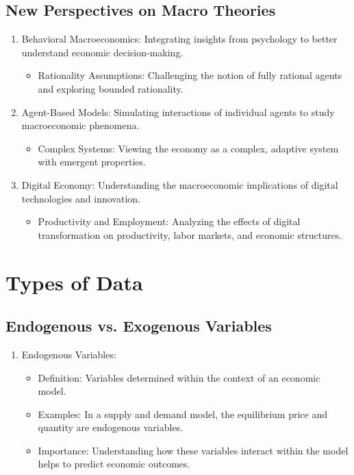 \documentclass[10pt]{article}
\begin{document}
\begin{enumerate}
\begin{enumerate}
\end{enumerate}

\subsection*{New Perspectives on Macro Theories}
\begin{enumerate}
  \item Behavioral Macroeconomics: Integrating insights from psychology to better understand economic decision-making.

    \begin{itemize}
      \item Rationality Assumptions: Challenging the notion of fully rational agents and exploring bounded rationality.
    \end{itemize}

  \item Agent-Based Models: Simulating interactions of individual agents to study macroeconomic phenomena.

    \begin{itemize}
      \item Complex Systems: Viewing the economy as a complex, adaptive system with emergent properties.
    \end{itemize}

  \item Digital Economy: Understanding the macroeconomic implications of digital technologies and innovation.

    \begin{itemize}
      \item Productivity and Employment: Analyzing the effects of digital transformation on productivity, labor markets, and economic structures.
    \end{itemize}
\end{enumerate}

\section*{Types of Data}
\subsection*{Endogenous vs. Exogenous Variables}
\begin{enumerate}
  \item Endogenous Variables:

    \begin{itemize}
      \item Definition: Variables determined within the context of an economic model.
      \item Examples: In a supply and demand model, the equilibrium price and quantity are endogenous variables.
      \item Importance: Understanding how these variables interact within the model helps to predict economic outcomes.
    \end{itemize}


\end{enumerate}
\end{enumerate}
\end{document}
